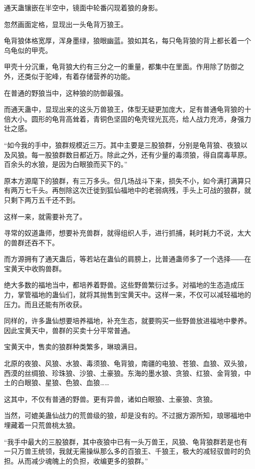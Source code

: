 
\begin{this_body}

通天蛊镶嵌在半空中，镜面中轮番闪现着狼的身影。

忽然画面定格，显现出一头龟背万狼王。

龟背狼体格宽厚，浑身墨绿，狼眼幽蓝。狼如其名，每只龟背狼的背上都长着一个乌龟似的甲壳。

甲壳十分沉重，龟背狼大约有三分之一的重量，都集中在里面。作用除了防御之外，还类似于驼峰，有着存储营养的功能。

在普通的野狼当中，这种狼的防御最强。

而通天蛊中，显现出来的这头万兽狼王，体型无疑更加庞大，足有普通龟背狼的十倍大小。圆形的龟背高耸着，青铜色坚固的龟壳锃光瓦亮，给人战力充沛，身强力壮之感。

“如今我的手中，狼群规模近三万。其中主要是三股狼群，分别是龟背狼、夜狼以及风狼。每一股狼群数目都近万。除此之外，还有少量的毒须狼，得自腐毒草原。百余头的水狼，是因为白眼狼而买下的。”

原本方源麾下的狼群，有三万多头。但几场战斗下来，损失不小，如今满打满算只有两万七千头。再刨除这次迁徙到狐仙福地中的老弱病残，手头上可战的狼群，就只剩下两万五千还不到。

这样一来，就需要补充了。

寻常的奴道蛊师，想要补充兽群，就得组织人手，进行抓捕，耗时耗力不说，太大的兽群还吞不下。

而方源拥有了通天蛊后，等若站在蛊仙的肩膀上，比普通蛊师多了一个选择――在宝黄天中收购兽群。

绝大多数的福地当中，都培养着野兽。这些野兽繁衍过多。对福地的生态造成压力，掌管福地的蛊仙们，就将其抛售到宝黄天中。这样一来，不仅可以减轻福地的压力。而且还能有所收获。

同样的，许多蛊仙想要培养福地，补充生态，就要购买一些野兽放进福地中豢养。因此宝黄天中，兽群的买卖十分平常普通。

宝黄天中，售卖的狼群种类繁多，琳琅满目。

北原的夜狼、风狼、水狼、毒须狼、龟背狼，南疆的电狼、苍狼、血狼、双头狼，西漠的丝绸狼、珍珠狼、沙狼、土豪狼。东海的墨水狼、贪狼、红狼、金背狼，中土的白眼狼、星狼、色狼、血狼……

这其中，不仅有普通的野兽。更有异兽，诸如白眼狼、土豪狼、贪狼。

当然，可媲美蛊仙战力的荒兽级的狼，却是没有的。不过据方源所知，琅琊福地中埋藏着一只荒兽桃太狼。

“我手中最大的三股狼群，其中夜狼中已有一头万兽王，风狼、龟背狼群若是也有一只万兽王统领，我就无需操纵那么多的百狼王、千狼王，极大的减轻驭兽时的负担。从而减少魂魄上的负担，收编更多的狼群。”


\end{this_body}
